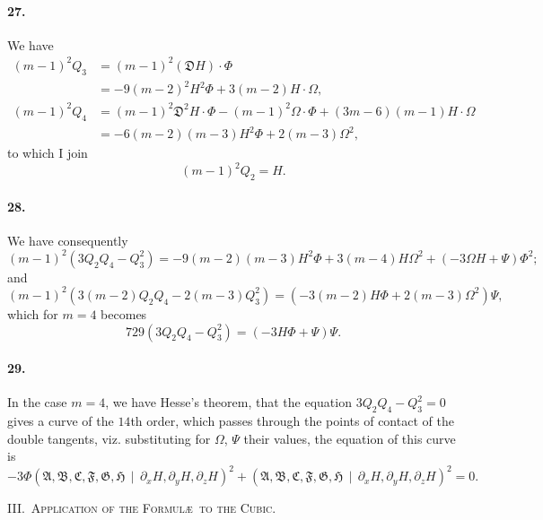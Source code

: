 \documentclass[12pt,a4paper]{article}
\theoremstyle{plain}
\begin{document}
\paragraph{27.}
We  have
\begin{align*}
(m-1)^2 Q_3 &= (m-1)^2 (\mathfrak{D} H) \cdot \Phi \\
&= -9(m-2)^2 H^2 \Phi + 3(m-2)H \cdot \Omega, \\
(m-1)^2 Q_4 &= (m-1)^2 \mathfrak{D}^2 H \cdot \Phi - (m-1)^2 \Omega \cdot \Phi + (3m-6)(m-1) H \cdot \Omega \\
&= -6(m-2)(m-3) H^2 \Phi + 2(m-3) \Omega^2,
\end{align*}
to  which  I  join
\[
(m-1)^2 Q_2 = H.
\]

\paragraph{28.}
We  have  consequently
\[
(m-1)^2 (3Q_2 Q_4 - Q_3^2) = -9(m-2)(m-3) H^2 \Phi + 3(m-4) H \Omega^2 + (-3\Omega H + \Psi) \Phi^2;
\]
and
\[
(m-1)^2 (3(m-2)Q_2 Q_4 - 2(m-3)Q_3^2) = (-3(m-2)H \Phi + 2(m-3)\Omega^2) \Psi,
\]
which  for  $m = 4$  becomes
\[
729(3Q_2 Q_4 - Q_3^2) = (-3H \Phi + \Psi) \Psi.
\]

\paragraph{29.}
In  the  case  $m = 4$,  we  have  Hesse's  theorem,  that  the  equation  $3Q_2 Q_4 - Q_3^2 = 0$
gives  a  curve  of  the  $14$th  order,  which  passes  through  the  points  of  contact  of  the
double  tangents,  viz.  substituting  for  $\Omega$,  $\Psi$  their  values,  the  equation  of  this  curve  is
\[
-3\Phi (\mathfrak{A}, \mathfrak{B}, \mathfrak{C}, \mathfrak{F}, \mathfrak{G}, \mathfrak{H} \,\!\!\mid\, \partial_x H, \partial_y H, \partial_z H)^2
+ (\mathfrak{A}, \mathfrak{B}, \mathfrak{C}, \mathfrak{F}, \mathfrak{G}, \mathfrak{H} \,\!\!\mid\, \partial_x H, \partial_y H, \partial_z H)^2 = 0.
\]

\newpage
\noindent\textsc{III.~Application  of  the  Formul\ae\ to  the  Cubic.}
\end{document}
